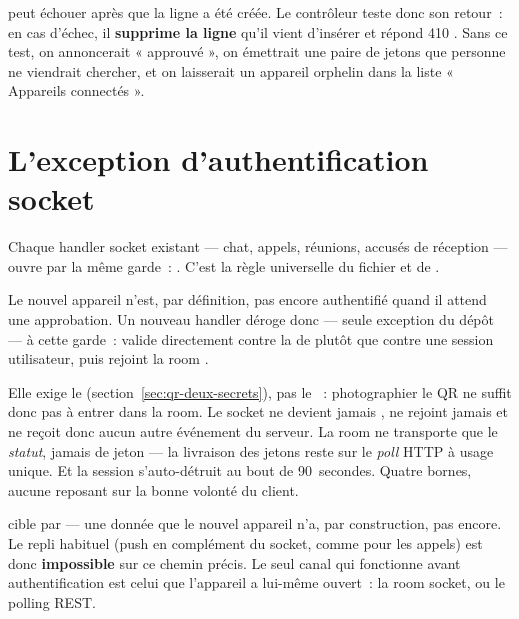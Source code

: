 \begin{note}
 peut échouer après que la ligne  a été créée. Le
contrôleur teste donc son retour~: en cas d'échec, il \textbf{supprime la ligne} qu'il
vient d'insérer et répond 410 . Sans ce test, on annoncerait
« approuvé », on émettrait une paire de jetons que personne ne viendrait chercher, et on
laisserait un appareil orphelin dans la liste « Appareils connectés ».
\end{note}

\section{L'exception d'authentification socket}
\label{sec:qr-socket-exception}

\begin{constat}
Chaque handler socket existant --- chat, appels, réunions, accusés de réception --- ouvre
par la même garde~: . C'est la règle universelle
du fichier  et de .
\end{constat}

Le nouvel appareil n'est, par définition, pas encore authentifié quand il attend une
approbation. Un nouveau handler  déroge donc --- seule exception du dépôt --- à cette
garde~:  valide directement
contre la  de  plutôt que contre une session
utilisateur, puis rejoint la room .

\begin{note}
Elle exige le \textbf{} (section~\ref{sec:qr-deux-secrets}), pas le
~: photographier le QR ne suffit donc pas à entrer dans la room. Le socket
ne devient jamais , ne rejoint jamais  et ne reçoit donc
aucun autre événement du serveur. La room ne transporte que le \emph{statut}, jamais de
jeton --- la livraison des jetons reste sur le \emph{poll} HTTP à usage unique. Et la
session s'auto-détruit au bout de 90~secondes. Quatre bornes, aucune reposant sur la
bonne volonté du client.
\end{note}

\begin{note}
 cible par  --- une donnée que le
nouvel appareil n'a, par construction, pas encore. Le repli habituel (push en complément du
socket, comme pour les appels) est donc \textbf{impossible} sur ce chemin précis. Le seul
canal qui fonctionne avant authentification est celui que l'appareil a lui-même ouvert~: la
room socket, ou le polling REST.
\end{note}

